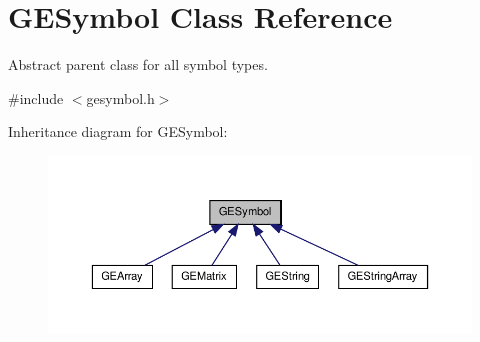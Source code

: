 \hypertarget{class_g_e_symbol}{\section{G\-E\-Symbol Class Reference}
\label{class_g_e_symbol}
}


Abstract parent class for all symbol types.  




{\ttfamily \#include $<$gesymbol.\-h$>$}



Inheritance diagram for G\-E\-Symbol\-:
\nopagebreak
\begin{figure}[H]
\begin{center}
\leavevmode
\includegraphics[width=350pt]{class_g_e_symbol__inherit__graph}
\end{center}
\end{figure}
